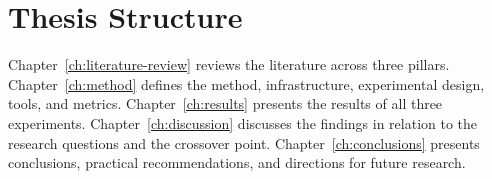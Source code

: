 
\section{Thesis Structure}
\label{sec:thesis-structure}

Chapter~\ref{ch:literature-review} reviews the literature across three pillars. Chapter~\ref{ch:method} defines the method, infrastructure, experimental design, tools, and metrics. Chapter~\ref{ch:results} presents the results of all three experiments. Chapter~\ref{ch:discussion} discusses the findings in relation to the research questions and the crossover point. Chapter~\ref{ch:conclusions} presents conclusions, practical recommendations, and directions for future research.

